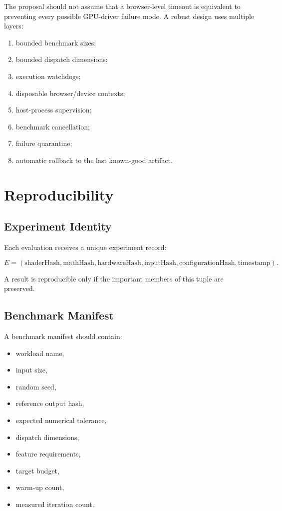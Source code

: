 \documentclass[11pt,a4paper,oneside]{report}
\begin{document}
The proposal should not assume that a browser-level timeout is equivalent to preventing every
possible GPU-driver failure mode. A robust design uses multiple layers:

\begin{enumerate}
  \item bounded benchmark sizes;
  \item bounded dispatch dimensions;
  \item execution watchdogs;
  \item disposable browser/device contexts;
  \item host-process supervision;
  \item benchmark cancellation;
  \item failure quarantine;
  \item automatic rollback to the last known-good artifact.
\end{enumerate}

\chapter{Reproducibility}

\section{Experiment Identity}

Each evaluation receives a unique experiment record:

\begin{equation}
E=
(
\mathrm{shaderHash},
\mathrm{mathHash},
\mathrm{hardwareHash},
\mathrm{inputHash},
\mathrm{configurationHash},
\mathrm{timestamp}
).
\end{equation}

A result is reproducible only if the important members of this tuple are preserved.

\section{Benchmark Manifest}

A benchmark manifest should contain:

\begin{itemize}
  \item workload name,
  \item input size,
  \item random seed,
  \item reference output hash,
  \item expected numerical tolerance,
  \item dispatch dimensions,
  \item feature requirements,
  \item target budget,
  \item warm-up count,
  \item measured iteration count.
\end{itemize}
\end{document}
